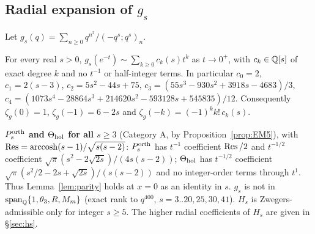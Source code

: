 \subsection{Radial expansion of $g_s$}\label{app:gs}
Let $g_s(q)=\sum_{n\ge0}q^{n^2}/(-q^s;q^s)_n$.
\begin{theorem}\label{thm:Gs}
For every real $s>0$, $g_s(e^{-t})\sim\sum_{k\ge0}c_k(s)t^k$ as $t\to0^+$, with $c_k\in\mathbb{Q}[s]$ of exact degree $k$ and no $t^{-1}$ or
half-integer terms. In particular $c_0=2$, $c_1=2(s-3)$, $c_2=5s^2-44s+75$, $c_3=(55s^3-930s^2+3918s-4683)/3$,
$c_4=(1073s^4-28864s^3+214620s^2-593128s+545835)/12$. Consequently $\zeta_g(0)=1$, $\zeta_g(-1)=6-2s$ and $\zeta_g(-k)=(-1)^kk!\,c_k(s)$.
\end{theorem}
\noindent\textbf{$P^{\mathrm{orth}}_s$ and $\Theta_{\mathrm{hol}}$ for all $s\ge3$} (Category A, by Proposition~\ref{prop:EM5}), with $\operatorname*{Res}=\operatorname{arccosh}(s-1)/\sqrt{s(s-2)}$:
$P^{\mathrm{orth}}_s$ has $t^{-1}$ coefficient $\operatorname*{Res}/2$ and $t^{-1/2}$ coefficient $\sqrt\pi(s^2-2\sqrt{2s})/(4s(s-2))$; $\Theta_{\mathrm{hol}}$ has $t^{-1/2}$ coefficient
$\sqrt\pi(s^2/2-2s+\sqrt{2s})/(s(s-2))$ and no integer-order terms through $t^1$. Thus Lemma~\ref{lem:parity} holds at $x=0$ as an identity in $s$. $g_s$ is not
in $\mathrm{span}_{\mathbb{Q}}\{1,\theta_3,R,M_m\}$ (exact rank to $q^{400}$, $s=3..20,25,30,41$). $H_s$ is Zwegers-admissible only for integer $s\ge5$.
The higher radial coefficients of $H_s$ are given in \S\ref{sec:hs}.

